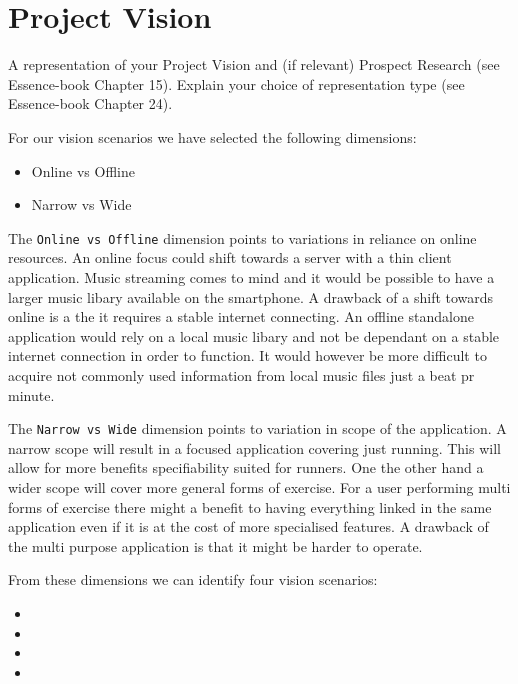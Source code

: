 \section{Project Vision}
A representation of your Project Vision and (if relevant) Prospect Research (see Essence-book Chapter 15).
Explain your choice of representation type (see Essence-book Chapter 24).

For our vision scenarios \cite[ p. 127]{essence} we have selected the following dimensions:
\begin{itemize}
\item Online vs Offline %
\item Narrow vs Wide
\end{itemize}

The \texttt{Online vs Offline} dimension points to variations in reliance on online resources. An online focus could shift  towards a server with a thin client application. Music streaming comes to mind and it would be possible to have a larger music libary available on the smartphone. A drawback of a shift towards online is a the it requires a stable internet connecting. An offline standalone application would rely on a local music libary and not be dependant on a stable internet connection in order to function. It would however be more difficult to acquire not commonly used information from local music files just a beat pr minute.


The \texttt{Narrow vs Wide} dimension points to variation in scope of the application. A narrow scope will result in a focused application covering just running. This will allow for more benefits specifiability suited for runners. One the other hand a wider scope will cover more general forms of exercise. For a user performing multi forms of exercise there might a benefit to having everything linked in the same application even if it is at the cost of more specialised features. A drawback of the multi purpose application is that it might be harder to operate.

From these dimensions we can identify four vision scenarios:

\begin{itemize}
\item %
\item %
\item %
\item %
\end{itemize}







